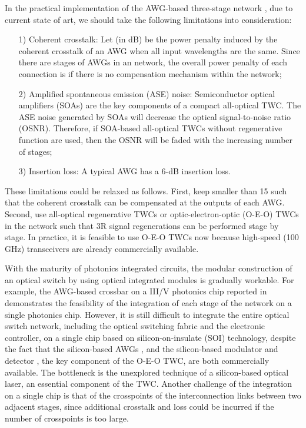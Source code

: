 \documentclass[journal]{IEEEtran}
\begin{document}
In the practical implementation of the AWG-based three-stage network
, due to current state of art, we should take the following limitations into consideration:
\begin{itemize}
\item[1)] Coherent crosstalk: Let  (in dB) be the power penalty induced
by the coherent crosstalk of an  AWG when all input
wavelengths are the same. Since there are  stages of
 AWGs in an   network, the
overall power penalty of each connection is  if there is
no compensation mechanism within the network;
\item[2)] Amplified spontaneous emission (ASE) noise:
Semiconductor optical amplifiers (SOAs) are the key components of a
compact all-optical TWC. The ASE noise generated by SOAs will
decrease the optical signal-to-noise ratio (OSNR). Therefore, if
SOA-based all-optical TWCs without regenerative function are used,
then the OSNR will be faded with the increasing number of stages;
\item[3)] Insertion loss: A typical AWG has a 6-dB insertion loss.
\end{itemize}
These limitations could be relaxed as follows. First, keep 
smaller than 15 \cite{Gaudino:ICC2008} such that the coherent
crosstalk can be compensated at the outputs of each  AWG.
Second, use all-optical regenerative TWCs
\cite{Chayet:OFC2004,Porzi:PTL2013} or optic-electron-optic (O-E-O)
TWCs \cite{Blumenthal:JSTQE} in the network such that 3R signal
regenerations can be performed stage by stage. In practice, it is
feasible to use O-E-O TWCs now because high-speed (100 GHz)
transceivers are already commercially available.

With the maturity of photonics integrated circuits, the modular
construction of an optical switch by using optical integrated
modules is gradually workable. For example, the 
AWG-based crossbar on a III/V photonics chip reported in
\cite{Blumenthal:JSTQE} demonstrates the feasibility of the
integration of each stage of the  network on a
single photonics chip. However, it is still difficult to integrate
the entire optical switch network, including the optical switching
fabric and the electronic controller, on a single chip based on
silicon-on-insulate (SOI) technology, despite the fact that the silicon-based
AWGs \cite{Cheung:CLEO2012}, and the silicon-based modulator and
detector \cite{Dhiman:JAP2013}, the key component of the O-E-O TWC,
are both commercially available. The bottleneck is the unexplored
technique of a silicon-based optical laser, an essential component of
the TWC. Another challenge of the integration on a single chip is that of
the crosspoints of the interconnection links between two adjacent
stages, since additional crosstalk and loss could be incurred if the
number of crosspoints is too large.
\end{document}
